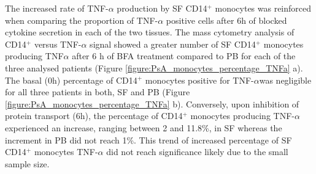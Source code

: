 The increased rate of TNF-$\alpha$ production by SF CD14$^+$ monocytes was reinforced when comparing the proportion of TNF-$\alpha$ positive cells after 6h of blocked cytokine secretion in each of the two tissues. The mass cytometry analysis of CD14$^+$ versus TNF-$\alpha$ signal showed a greater number of SF CD14$^+$ monocytes producing TNF$\alpha$ after 6 h of BFA treatment compared to PB for each of the three analysed patients (Figure \ref{figure:PsA_monocytes_percentage_TNFa} a). The basal (0h) percentage of CD14$^+$ monocytes positive for TNF-$\alpha$was negligible for all three patients in both, SF and PB (Figure \ref{figure:PsA_monocytes_percentage_TNFa} b). Conversely, upon inhibition of protein transport (6h), the percentage of CD14$^+$ monocytes producing TNF-$\alpha$ experienced an increase, ranging between 2 and 11.8\%, in SF whereas the increment in PB did not reach 1\%. This trend of increased percentage of SF CD14$^+$ monocytes TNF-$\alpha$ did not reach significance likely due to the small sample size. 
 
